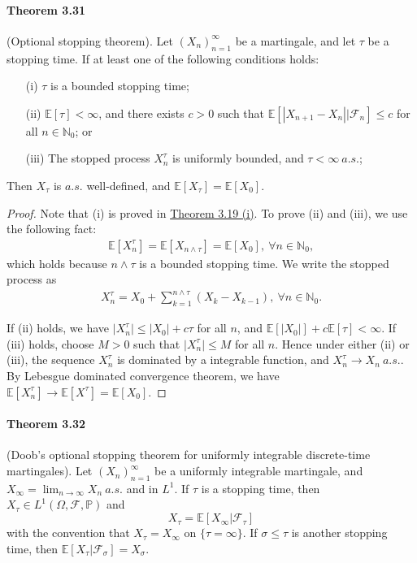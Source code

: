 \documentclass{article}
\numberwithin{equation}{section}
\newcommand{\E}{\mathbb{E}}
\renewcommand{\P}{\mathbb{P}}
\theoremstyle{plain}
\theoremstyle{definition}
\begin{document}
\paragraph{Theorem 3.31\label{thm:3.31}} (Optional stopping theorem). Let $(X_n)_{n=1}^\infty$ be a martingale, and let $\tau$ be a stopping time. If at least one of the following conditions holds:
\begin{itemize}
	\item[(i)] $\tau$ is a bounded stopping time;
	\item[(ii)] $\E[\tau]<\infty$, and there exists $c>0$ such that $\E[\left\vert X_{n+1}-X_n
	\right\vert|\mathscr{F}_n]\leq c$ for all $n\in\mathbb{N}_0$; or
	\item[(iii)] The stopped process $X_n^\tau$ is uniformly bounded, and $\tau<\infty\ a.s.$;
\end{itemize}
Then $X_\tau$ is $a.s.$ well-defined, and $\E[X_\tau]=\E[X_0]$.

\begin{proof}
Note that (i) is proved in \hyperref[thm:3.19]{Theorem 3.19 (i)}. To prove (ii) and (iii), we use the following fact:
\begin{align*}
	\E[X_n^\tau]=\E[X_{n\wedge\tau}]=\E[X_0],\ \forall n\in\mathbb{N}_0,
\end{align*}
which holds because $n\wedge\tau$ is a bounded stopping time. We write the stopped process as
\begin{align*}
	X_n^\tau = X_0 + \sum_{k=1}^{n\wedge\tau}(X_k - X_{k-1}),\ \forall n\in\mathbb{N}_0.
\end{align*}

If (ii) holds, we have $\vert X_n^\tau\vert \leq\vert X_0\vert + c\tau$  for all $n$, and $\E[\vert X_0\vert] + c\E[\tau]<\infty$.  If (iii) holds, choose $M>0$ such that $\vert X_n^\tau\vert\leq M$ for all $n$. Hence under either (ii) or (iii), the sequence $X_n^\tau$ is dominated by a integrable function, and $X_n^\tau\to X_n\ a.s.$. By Lebesgue dominated convergence theorem, we have $\E[X_n^\tau]\to \E[X^\tau] = \E[X_0]$.
\end{proof}

\paragraph{Theorem 3.32\label{thm:3.32}} (Doob's optional stopping theorem for uniformly integrable discrete-time martingales). Let $(X_n)_{n=1}^\infty$ be a uniformly integrable martingale, and $X_\infty=\lim_{n\to\infty}X_n\ a.s.$ and in $L^1$. If $\tau$ is a stopping time, then $X_\tau\in L^1(\Omega,\mathscr{F},\P)$ and $$X_\tau=\E[X_\infty|\mathscr{F}_\tau]$$
with the convention that $X_\tau=X_\infty$ on $\{\tau=\infty\}$. If $\sigma\leq\tau$ is another stopping time, then $\E[X_\tau|\mathscr{F}_\sigma]=X_\sigma$.
\end{document}
